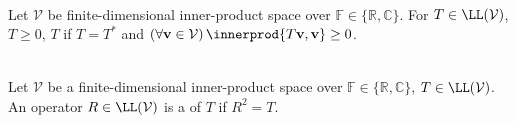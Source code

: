 \begin{definition} \label{def:positive-operator} \\
Let $\mathcal{V}$ be finite-dimensional inner-product space over $\mathbb{F}\in\{\mathbb{R},\mathbb{C}\}$. For $T\in\LL(\mathcal{V})$, $T\geq0$, $T$  if $T=T^*$ and $(\forall\mathbf{v}\in\mathcal{V})\,\innerprod{T\mathbf{v},\mathbf{v}}\geq0$.
\end{definition}

\begin{definition} \label{def:square-root-operator} \\
Let $\mathcal{V}$ be a finite-dimensional inner-product space over $\mathbb{F}\in\{\mathbb{R},\mathbb{C}\}$, $T\in\LL(\mathcal{V})$. An operator $R\in\LL(\mathcal{V})$ is a  of $T$ if $R^2=T$.
\end{definition}

